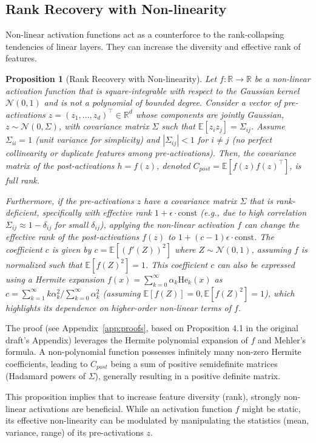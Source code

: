 \documentclass{article}
\newcommand{\R}{\mathbb{R}}
\newcommand{\E}{\mathbb{E}}
\newcommand{\He}{\mathrm{He}}
\newtheorem{proposition}{Proposition}[section]
\begin{document}
\subsection{Rank Recovery with Non-linearity}
Non-linear activation functions act as a counterforce to the rank-collapsing tendencies of linear layers. They can increase the diversity and effective rank of features.
\begin{proposition}[Rank Recovery with Non-linearity]
\label{prop:rank_recovery_nonlinearity}
Let $f:\R\to\R$ be a non-linear activation function that is square-integrable with respect to the Gaussian kernel $\mathcal{N}(0,1)$ and is not a polynomial of bounded degree. Consider a vector of pre-activations $z = (z_1, \dots, z_d)^\top \in\R^d$ whose components are jointly Gaussian, $z \sim \mathcal{N}(0, \Sigma)$, with covariance matrix $\Sigma$ such that $\E[z_i z_j]=\Sigma_{ij}$. Assume $\Sigma_{ii}=1$ (unit variance for simplicity) and $|\Sigma_{ij}|<1$ for $i \neq j$ (no perfect collinearity or duplicate features among pre-activations).
Then, the covariance matrix of the post-activations $h = f(z)$, denoted $C_{post} = \E[f(z)f(z)^\top]$, is full rank.

Furthermore, if the pre-activations $z$ have a covariance matrix $\Sigma$ that is rank-deficient, specifically with effective rank $1 + \epsilon \cdot \text{const}$ (e.g., due to high correlation $\Sigma_{ij} \approx 1-\delta_{ij}$ for small $\delta_{ij}$), applying the non-linear activation $f$ can change the effective rank of the post-activations $f(z)$ to $1 + (c-1)\epsilon \cdot \text{const}$. The coefficient $c$ is given by $c = \E[(f'(Z))^2]$ where $Z \sim \mathcal{N}(0,1)$, assuming $f$ is normalized such that $\E[f(Z)^2]=1$. This coefficient $c$ can also be expressed using a Hermite expansion $f(x) = \sum_{k=0}^\infty \alpha_k \He_k(x)$ as $c = \sum_{k=1}^\infty k \alpha_k^2 / \sum_{k=0}^\infty \alpha_k^2$ (assuming $\E[f(Z)]=0, \E[f(Z)^2]=1$), which highlights its dependence on higher-order non-linear terms of $f$.
\end{proposition}
The proof (see Appendix~\ref{app:proofs}, based on Proposition 4.1 in the original draft's Appendix) leverages the Hermite polynomial expansion of $f$ and Mehler's formula. A non-polynomial function possesses infinitely many non-zero Hermite coefficients, leading to $C_{post}$ being a sum of positive semidefinite matrices (Hadamard powers of $\Sigma$), generally resulting in a positive definite matrix.

This proposition implies that to increase feature diversity (rank), strongly non-linear activations are beneficial. While an activation function $f$ might be static, its effective non-linearity can be modulated by manipulating the statistics (mean, variance, range) of its pre-activations $z$.
\end{document}
